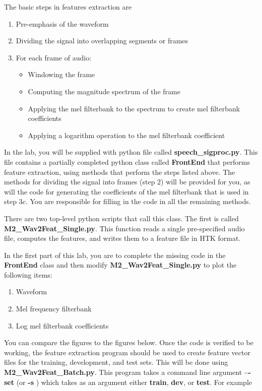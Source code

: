 The basic steps in features extraction are
\begin{enumerate}
  \item Pre-emphasis of the waveform
  \item Dividing the signal into overlapping segments or frames
  \item For each frame of audio:
    \begin{itemize}
      \item Windowing the frame
      \item Computing the magnitude spectrum of the frame
      \item Applying the mel filterbank to the spectrum to create mel filterbank coefficients
      \item Applying a logarithm operation to the mel filterbank coefficient
    \end{itemize}
\end{enumerate}
In the lab, you will be supplied with python file called {\bf speech\_sigproc.py}. This file contains a partially completed python class called {\bf FrontEnd} that performs feature extraction, using methods that perform the steps listed above. The methods for dividing the signal into frames (step 2) will be provided for you, as will the code for generating the coefficients of the mel filterbank that is used in step 3c. You are responsible for filling in the code in all the remaining methods.

There are two top-level python scripts that call this class. The first is called {\bf M2\_Wav2Feat\_Single.py}. This function reads a single pre-specified audio file, computes the features, and writes them to a feature file in HTK format.

In the first part of this lab, you are to complete the missing code in the {\bf FrontEnd} class and then modify {\bf M2\_Wav2Feat\_Single.py} to plot the following items:
\begin{enumerate}
  \item Waveform
  \item Mel frequency filterbank
  \item Log mel filterbank coefficients
\end{enumerate}

You can compare the figures to the figures below. Once the code is verified to be working, the feature extraction program should be used to create feature vector files for the training, development, and test sets. This will be done using {\bf M2\_Wav2Feat\_Batch.py}. This program takes a command line argument {\bf –-set} (or {\bf -s} ) which takes as an argument either {\bf train}, {\bf dev}, or {\bf test}. For example

